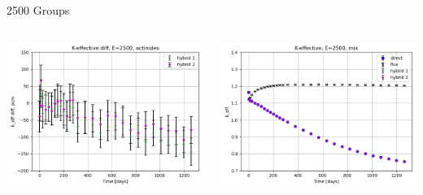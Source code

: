 \documentclass[
	11pt, %
	aspectratio=169, %
]{beamer}
\begin{document}
\begin{frame}{2500 Groups}
\begin{columns}[c]
\begin{column}{0.32\textwidth}
			\includegraphics[width=\textwidth]{../figures/keff/keff_actinides_2500_diff.png}
		\end{column}
		\begin{column}{0.32\textwidth} %
			\includegraphics[width=\textwidth]{../figures/keff/keff_mix_2500.png}


\end{column}
\end{columns}
\end{frame}
\end{document}

